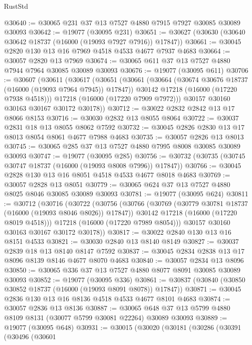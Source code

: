 \begin{lexlean}{RustStd}
\begin{coremodule}
@30640 := @30065 @231 @37 @13 @7527 @4880 @7915 @7927 @30085 @30089 @30093
@30642 := @19077 (@30095 @231)
@30651 := @30627 (@30630 (@30640 @30642 @18737 (@16000 (@19093 @7927 @7916)) @17847))
@30661 := @30045 @2820 @130 @13 @16 @7969 @4518 @4533 @4677 @7937 @4683
@30664 := @30057 @2820 @13 @7969
@30674 := @30065 @611 @37 @13 @7527 @4880 @7944 @7964 @30085 @30089 @30093
@30676 := @19077 (@30095 @611)
@30706 := @30607
    (@30611
      (@30617
        (@30651
          (@30661
            (@30664 (@30674 @30676 @18737 (@16000 (@19093 @7964 @7945)) @17847))
            @30142
            @17218
            (@16000 (@17220 @7938 @4518)))
          @17218
          (@16000 (@17220 @7909 @7972)))
        @30157
        @30160
        @30163
        @30167
        @30172
        @30178))
@30712 := @30022 @2832 @2842 @13 @17 @8066 @8153
@30716 := @30030 @2832 @13 @8055 @8064
@30722 := @30037 @2831 @18 @13 @8055 @8062 @7592
@30732 := @30045 @2826 @2830 @13 @17 @8013 @8054 @8061 @4677 @7988 @4683
@30735 := @30057 @2826 @13 @8013
@30745 := @30065 @285 @37 @13 @7527 @4880 @7995 @8008 @30085 @30089 @30093
@30747 := @19077 (@30095 @285)
@30756 := @30732 (@30735 (@30745 @30747 @18737 (@16000 (@19093 @8008 @7996)) @17847))
@30766 := @30045 @2828 @130 @13 @16 @8051 @4518 @4533 @4677 @8018 @4683
@30769 := @30057 @2828 @13 @8051
@30779 := @30065 @624 @37 @13 @7527 @4880 @8025 @8046 @30085 @30089 @30093
@30781 := @19077 (@30095 @624)
@30811 := @30712
    (@30716
      (@30722
        (@30756
          (@30766
            (@30769 (@30779 @30781 @18737 (@16000 (@19093 @8046 @8026)) @17847))
            @30142
            @17218
            (@16000 (@17220 @8019 @4518)))
          @17218
          (@16000 (@17220 @7989 @8054)))
        @30157
        @30160
        @30163
        @30167
        @30172
        @30178))
@30817 := @30022 @2840 @130 @13 @16 @8151 @4533
@30821 := @30030 @2840 @13 @8140 @8149
@30827 := @30037 @2839 @18 @13 @8140 @8147 @7592
@30837 := @30045 @2834 @2838 @13 @17 @8096 @8139 @8146 @4677 @8070 @4683
@30840 := @30057 @2834 @13 @8096
@30850 := @30065 @336 @37 @13 @7527 @4880 @8077 @8091 @30085 @30089 @30093
@30852 := @19077 (@30095 @336)
@30861 := @30837 (@30840 (@30850 @30852 @18737 (@16000 (@19093 @8091 @8078)) @17847))
@30871 := @30045 @2836 @130 @13 @16 @8136 @4518 @4533 @4677 @8101 @4683
@30874 := @30057 @2836 @13 @8136
@30887 := @30065 @648 @37 @13 @5799 @4880 @8109 @8131 (@30077 @5799 @30081 @22264) @30089 @30093
@30889 := @19077 (@30095 @648)
@30931 := @30015
    (@30020
      (@30181
        (@30286
          (@30391
            (@30496
              (@30601

\end{coremodule}
\end{lexlean}
